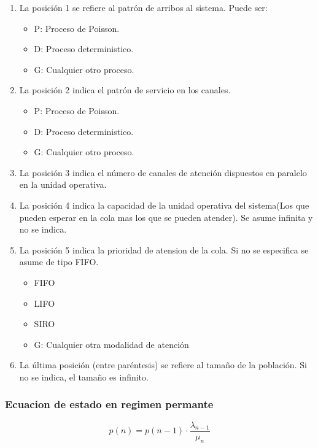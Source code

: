 \documentclass{article}
\begin{document}
\begin{enumerate}
    \item La posición 1 se refiere al patrón de arribos al sistema. Puede ser:
    \begin{itemize}
        \item P: Proceso de Poisson.
        \item D: Proceso deterministico.
        \item G: Cualquier otro proceso.
    \end{itemize}
    \item La posición 2 indica el patrón de servicio en los canales.
    \begin{itemize}
        \item P: Proceso de Poisson.
        \item D: Proceso deterministico.
        \item G: Cualquier otro proceso.
    \end{itemize}
    \item La posición 3 indica el número de canales de atención dispuestos en paralelo en la unidad operativa.
    \item La posición 4 indica la capacidad de la unidad operativa del sistema(Los que pueden esperar en la cola mas los que se pueden atender). Se asume infinita y no se indica.
    \item La posición 5 indica la prioridad de atension de la cola.  Si no se especifica se asume de tipo FIFO.
    \begin{itemize}
        \item FIFO
        \item LIFO
        \item SIRO
        \item G: Cualquier otra modalidad de atención
    \end{itemize}
    \item La última posición (entre paréntesis) se refiere al tamaño de la población. Si no se indica, el tamaño es infinito.
\end{enumerate}

\subsubsection{Ecuacion de estado en regimen permante}

\begin{equation}
    p(n)= p(n-1) \cdot \frac{ \lambda_{n-1}}{\mu_n}
\end{equation}
\end{document}
